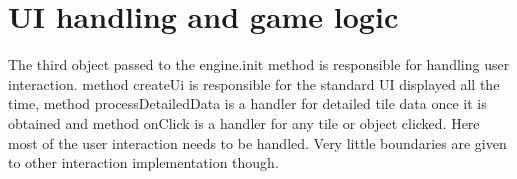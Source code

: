 \documentclass[11pt,oneside, final]{fithesis2}
\begin{document}
\section{UI handling and game logic}
The third object passed to the engine.init method is responsible for handling user interaction. method createUi is responsible for the standard UI displayed all the time, method processDetailedData is a handler for detailed tile data once it is obtained and method onClick is a handler for any tile or object clicked. Here most of the user interaction needs to be handled. Very little boundaries are given to other interaction implementation though.
\end{document}
